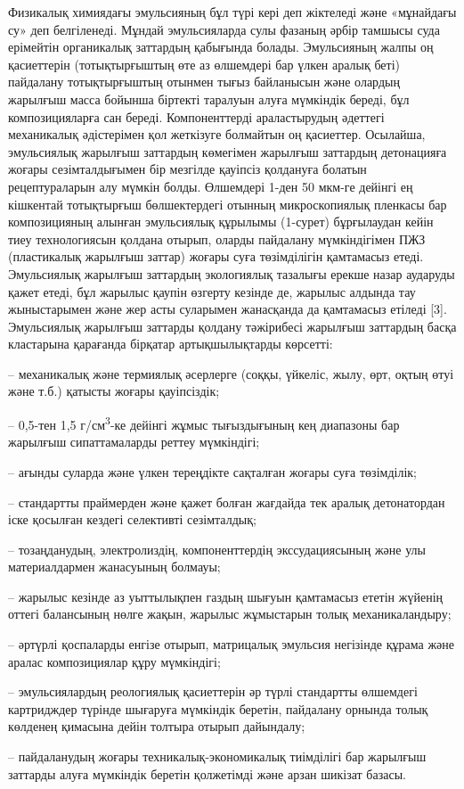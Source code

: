 \begin{multicols}{2}
Физикалық химиядағы эмульсияның бұл түрі кері деп жіктеледі және
«мұнайдағы су» деп белгіленеді. Мұндай эмульсияларда сулы фазаның әрбір
тамшысы суда ерімейтін органикалық заттардың қабығында болады.
Эмульсияның жалпы оң қасиеттерін (тотықтырғыштың өте аз өлшемдері бар
үлкен аралық беті) пайдалану тотықтырғыштың отынмен тығыз байланысын
және олардың жарылғыш масса бойынша біртекті таралуын алуға мүмкіндік
береді, бұл композицияларға сан береді. Компоненттерді араластырудың
әдеттегі механикалық әдістерімен қол жеткізуге болмайтын оң қасиеттер.
Осылайша, эмульсиялық жарылғыш заттардың көмегімен жарылғыш заттардың
детонацияға жоғары сезімталдығымен бір мезгілде қауіпсіз қолдануға
болатын рецептураларын алу мүмкін болды. Өлшемдері 1-ден 50 мкм-ге
дейінгі ең кішкентай тотықтырғыш бөлшектердегі отынның микроскопиялық
пленкасы бар композицияның алынған эмульсиялық құрылымы (1-сурет)
бұрғылаудан кейін тиеу технологиясын қолдана отырып, оларды пайдалану
мүмкіндігімен ПЖЗ (пластикалық жарылғыш заттар) жоғары суға төзімділігін
қамтамасыз етеді. Эмульсиялық жарылғыш заттардың экологиялық тазалығы
ерекше назар аударуды қажет етеді, бұл жарылыс қаупін өзгерту кезінде
де, жарылыс алдында тау жыныстарымен және жер асты суларымен жанасқанда
да қамтамасыз етіледі {[}3{]}. Эмульсиялық жарылғыш заттарды қолдану
тәжірибесі жарылғыш заттардың басқа кластарына қарағанда бірқатар
артықшылықтарды көрсетті:

-- механикалық және термиялық әсерлерге (соққы, үйкеліс, жылу, өрт,
оқтың өтуі және т.б.) қатысты жоғары қауіпсіздік;

-- 0,5-тен 1,5 г/см\textsuperscript{3}-ке дейінгі жұмыс тығыздығының кең
диапазоны бар жарылғыш сипаттамаларды реттеу мүмкіндігі;

-- ағынды суларда және үлкен тереңдікте сақталған жоғары суға
төзімділік;

-- стандартты праймерден және қажет болған жағдайда тек аралық
детонатордан іске қосылған кездегі селективті сезімталдық;

-- тозаңданудың, электролиздің, компоненттердің экссудациясының және улы
материалдармен жанасуының болмауы;

-- жарылыс кезінде аз уыттылықпен газдың шығуын қамтамасыз ететін
жүйенің оттегі балансының нөлге жақын, жарылыс жұмыстарын толық
механикаландыру;

-- әртүрлі қоспаларды енгізе отырып, матрицалық эмульсия негізінде
құрама және аралас композициялар құру мүмкіндігі;

-- эмульсиялардың реологиялық қасиеттерін әр түрлі стандартты өлшемдегі
картридждер түрінде шығаруға мүмкіндік беретін, пайдалану орнында толық
көлденең қимасына дейін толтыра отырып дайындалу;

-- пайдаланудың жоғары техникалық-экономикалық тиімділігі бар жарылғыш
заттарды алуға мүмкіндік беретін қолжетімді және арзан шикізат базасы.
\end{multicols}

